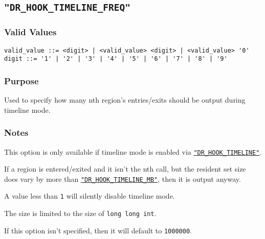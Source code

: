 

\subsection{\texttt{"DR\_HOOK\_TIMELINE\_FREQ"}}
\label{section:flags:DR_HOOK_TIMELINE_FREQ}
\vspace{-2ex}
\subsubsection{Valid Values}
\vspace{-2ex}
\verb+valid_value ::= <digit> | <valid_value> <digit> | <valid_value> '0'+ \\
\verb+digit ::= '1' | '2' | '3' | '4' | '5' | '6' | '7' | '8' | '9'+

\vspace{-2ex}
\subsubsection{Purpose}
\vspace{-2ex}
Used to specify how many nth region's entries/exits should be output during timeline mode.

\vspace{-2ex}
\subsubsection{Notes}
\vspace{-2ex}
This option is only available if timeline mode is enabled via \hyperref[section:flags:DR_HOOK_TIMELINE]{\texttt{"DR\_HOOK\_TIMELINE"}}.

If a region is entered/exited and it isn't the nth call, but the resident set size does vary by more than \hyperref[section:flags:DR_HOOK_TIMELINE_MB]{\texttt{"DR\_HOOK\_TIMELINE\_MB"}}, then it is output anyway. 

A value less than \verb|1| will silently disable timeline mode.

The size is limited to the size of \verb|long long int|.

If this option isn't specified, then it will default to \verb|1000000|.



